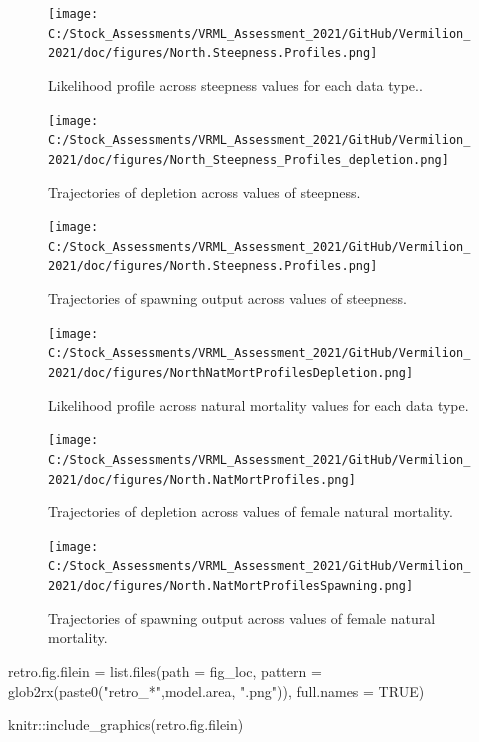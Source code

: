 \documentclass[
  english,
  a4paper,
]{article}
\newenvironment{Shaded}{\begin{snugshade}}{\end{snugshade}}
\newcommand{\AttributeTok}[1]{\textcolor[rgb]{0.77,0.63,0.00}{#1}}
\newcommand{\ConstantTok}[1]{\textcolor[rgb]{0.00,0.00,0.00}{#1}}
\newcommand{\FunctionTok}[1]{\textcolor[rgb]{0.00,0.00,0.00}{#1}}
\newcommand{\NormalTok}[1]{#1}
\newcommand{\OtherTok}[1]{\textcolor[rgb]{0.56,0.35,0.01}{#1}}
\newcommand{\SpecialCharTok}[1]{\textcolor[rgb]{0.00,0.00,0.00}{#1}}
\newcommand{\StringTok}[1]{\textcolor[rgb]{0.31,0.60,0.02}{#1}}
\begin{document}
\begin{figure}
\centering
\texttt{[image: C:/Stock\_Assessments/VRML\_Assessment\_2021/GitHub/Vermilion\_2021/doc/figures/North.Steepness.Profiles.png]}
\caption{Likelihood profile across steepness values for each data type..\label{fig:h-profile}}
\end{figure}

\begin{figure}
\centering
\texttt{[image: C:/Stock\_Assessments/VRML\_Assessment\_2021/GitHub/Vermilion\_2021/doc/figures/North\_Steepness\_Profiles\_depletion.png]}
\caption{Trajectories of depletion across values of steepness.\label{fig:h-depl}}
\end{figure}

\begin{figure}
\centering
\texttt{[image: C:/Stock\_Assessments/VRML\_Assessment\_2021/GitHub/Vermilion\_2021/doc/figures/North.Steepness.Profiles.png]}
\caption{Trajectories of spawning output across values of steepness.\label{fig:h-spawn}}
\end{figure}

\begin{figure}
\centering
\texttt{[image: C:/Stock\_Assessments/VRML\_Assessment\_2021/GitHub/Vermilion\_2021/doc/figures/NorthNatMortProfilesDepletion.png]}
\caption{Likelihood profile across natural mortality values for each data type.\label{fig:m-profile}}
\end{figure}

\begin{figure}
\centering
\texttt{[image: C:/Stock\_Assessments/VRML\_Assessment\_2021/GitHub/Vermilion\_2021/doc/figures/North.NatMortProfiles.png]}
\caption{Trajectories of depletion across values of female natural mortality.\label{fig:m-depl}}
\end{figure}

\begin{figure}
\centering
\texttt{[image: C:/Stock\_Assessments/VRML\_Assessment\_2021/GitHub/Vermilion\_2021/doc/figures/North.NatMortProfilesSpawning.png]}
\caption{Trajectories of spawning output across values of female natural mortality.\label{fig:m-spawn}}
\end{figure}

\begin{Shaded}
\begin{Highlighting}[]
\NormalTok{retro.fig.filein }\OtherTok{=} \FunctionTok{list.files}\NormalTok{(}\AttributeTok{path =}\NormalTok{ fig\_loc,  }
                  \AttributeTok{pattern =} \FunctionTok{glob2rx}\NormalTok{(}\FunctionTok{paste0}\NormalTok{(}\StringTok{"retro\_*"}\NormalTok{,model.area, }\StringTok{".png"}\NormalTok{)), }
                  \AttributeTok{full.names =} \ConstantTok{TRUE}\NormalTok{)}

\NormalTok{knitr}\SpecialCharTok{::}\FunctionTok{include\_graphics}\NormalTok{(retro.fig.filein)}
\end{Highlighting}
\end{Shaded}
\end{document}
